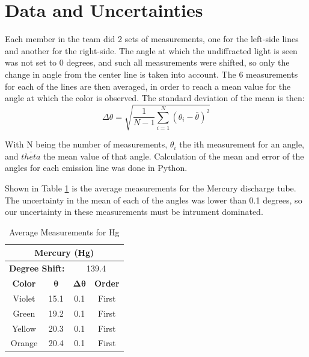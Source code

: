 \documentclass[a4paper, twocolumn]{article}
\begin{document}
\section{Data and Uncertainties}
Each member in the team did 2 sets of measurements, one for the left-side lines and another for the right-side. The angle at which
the undiffracted light is seen was not set to 0 degrees, and such all measurements were shifted, so only the change in angle from the center
line is taken into account. The 6 measurements for each of the lines are then averaged, in order to reach a mean value for the angle at which
the color is observed. The standard deviation of the mean is then:
\begin{equation}
 \Delta\theta = \sqrt{\frac{1}{N-1} \sum_{i=1}^{N}(\theta_i-\bar{\theta})^2}
\end{equation}

With N being the number of measurements, $\theta_i$ the ith measurement for an angle, and $\bar{theta}$ the mean value of that angle.
Calculation of the mean and error of the angles for each emission line was done in Python.

Shown in Table \ref{table:anglesHg} is the average measurements for the Mercury discharge tube. The uncertainty in the mean of each of the angles was
lower than 0.1 degrees, so our uncertainty in these measurements must be intrument dominated. 
\begin{table}[h!]
\centering
\begin{tabular}{ |c||c|c|c| }
 \hline
 \multicolumn{4}{|c|}{\textbf{Mercury (Hg)}} \\
 \hline
 \multicolumn{2}{|c}{\textbf{Degree Shift:}} &
 \multicolumn{2}{|c|}{139.4} \\
 \hline
 \textbf{Color} & $\boldsymbol{\theta}$ & $\boldsymbol{\Delta\theta}$ & \textbf{Order} \\
 \hline
 Violet & 15.1 & 0.1 & First \\
 \hline
 Green & 19.2 & 0.1 & First\\ 
 \hline
 Yellow & 20.3 & 0.1 & First \\
 \hline
 Orange & 20.4 & 0.1 & First \\
 \hline
\end{tabular}
\caption{Average Measurements for Hg}
\label{table:anglesHg}
\end{table}
\end{document}
